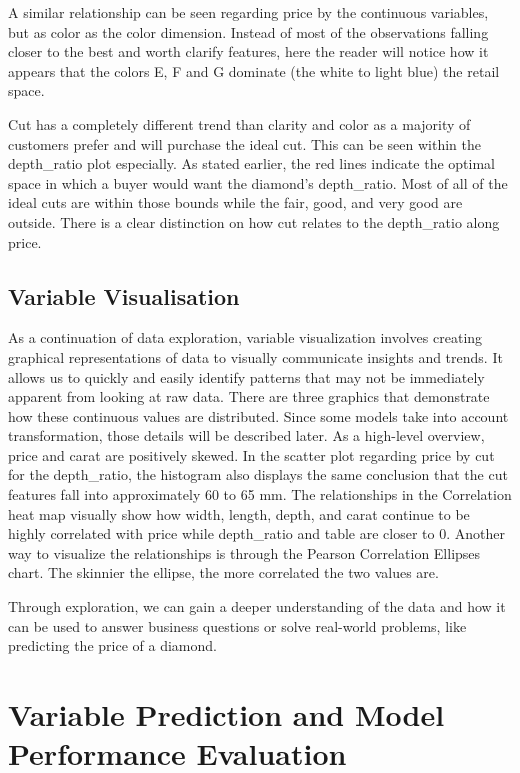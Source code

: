 \documentclass[
  paper=a4,
  ,captions=tableheading
]{scrartcl}
\begin{document}
A similar relationship can be seen regarding price by the continuous
variables, but as color as the color dimension. Instead of most of the
observations falling closer to the best and worth clarify features, here
the reader will notice how it appears that the colors E, F and G
dominate (the white to light blue) the retail space.

Cut has a completely different trend than clarity and color as a
majority of customers prefer and will purchase the ideal cut. This can
be seen within the depth\_ratio plot especially. As stated earlier, the
red lines indicate the optimal space in which a buyer would want the
diamond's depth\_ratio. Most of all of the ideal cuts are within those
bounds while the fair, good, and very good are outside. There is a clear
distinction on how cut relates to the depth\_ratio along price.

\hypertarget{variable-visualisation}{%
\subsection{Variable Visualisation}\label{variable-visualisation}}

As a continuation of data exploration, variable visualization involves
creating graphical representations of data to visually communicate
insights and trends. It allows us to quickly and easily identify
patterns that may not be immediately apparent from looking at raw data.
There are three graphics that demonstrate how these continuous values
are distributed. Since some models take into account transformation,
those details will be described later. As a high-level overview, price
and carat are positively skewed. In the scatter plot regarding price by
cut for the depth\_ratio, the histogram also displays the same
conclusion that the cut features fall into approximately 60 to 65 mm.
The relationships in the Correlation heat map visually show how width,
length, depth, and carat continue to be highly correlated with price
while depth\_ratio and table are closer to 0. Another way to visualize
the relationships is through the Pearson Correlation Ellipses chart. The
skinnier the ellipse, the more correlated the two values are.

Through exploration, we can gain a deeper understanding of the data and
how it can be used to answer business questions or solve real-world
problems, like predicting the price of a diamond.

\hypertarget{variable-prediction-and-model-performance-evaluation}{%
\section{Variable Prediction and Model Performance
Evaluation}\label{variable-prediction-and-model-performance-evaluation}}
\end{document}
